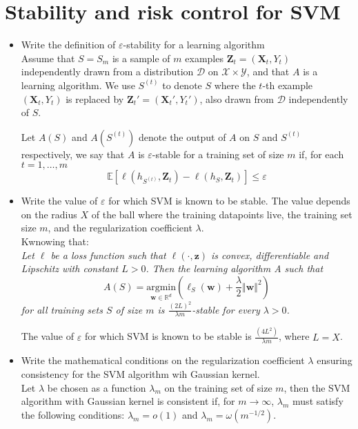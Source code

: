 \newpage
\section{Stability and risk control for SVM}

\begin{itemize}
    
    \item Write the definition of $\varepsilon$-stability for a learning algorithm\\

        Assume that $S = S_m$ is a sample of $m$ examples $\boldsymbol{Z}_t = (\boldsymbol{X}_t, Y_t)$ independently drawn from a distribution $\mathcal{D}$ on $\mathcal{X} \times \mathcal{Y}$, and that $A$ is a learning algorithm. We use $S^{(t)}$ to denote $S$ where the $t$-th example $(\boldsymbol{X}_t, Y_t)$ is replaced by $\boldsymbol{Z}_t' = (\boldsymbol{X}_t', Y_t')$, also drawn from $\mathcal{D}$ independently of $S$.
        
        Let $A(S)$ and $A(S^{(t)})$ denote the output of $A$ on $S$ and $S^{(t)}$ respectively, we say that $A$ is $\varepsilon$-stable for a training set of size $m$ if, for each $t = 1, \dots, m$
        \begin{equation}
            \mathbb{E}\left[\ell(h_{S^{(t)}}, \boldsymbol{Z}_t) - \ell(h_{S}, \boldsymbol{Z}_t)\right] \leq \varepsilon
        \end{equation}

    \item Write the value of $\varepsilon$ for which SVM is known to be stable. The value depends on the radius $X$ of the ball where the training datapoints live, the training set size $m$, and the regularization coefficient $\lambda$.\\
       
        Kwnowing that:\\ 
        \textit{Let $\ell$ be a loss function such that $\ell(\cdot, \boldsymbol{z})$ is convex, differentiable and Lipschitz with constant $L > 0$. Then the learning algorithm A such that}
        $$
        A(S) = \underset{\boldsymbol{w} \in \mathbb{R}^d}{\text{argmin}} \left( \ell_S(\boldsymbol{w}) + \frac{\lambda}{2} \Vert \boldsymbol{w} \Vert^2 \right)
        $$
    \textit{for all training sets $S$ of size $m$ is $\frac{(2L)^2}{\lambda m}$-stable for every $\lambda > 0$.}

        The value of $\varepsilon$ for which SVM is known to be stable is $\frac{(4L^2)}{\lambda m}$, where $L = X$.\\       

    \item Write the mathematical conditions on the regularization coefficient $\lambda$ ensuring consistency for the SVM algorithm wih Gaussian kernel.\\

       Let $\lambda$ be chosen as a function $\lambda_m$ on the training set of size $m$, then the SVM algorithm with Gaussian kernel is consistent if, for $m \rightarrow \infty$, $\lambda_m$ must satisfy the following conditions: $\lambda_m = o(1)$ and $\lambda_m = \omega (m^{-1/2})$.

\end{itemize}
